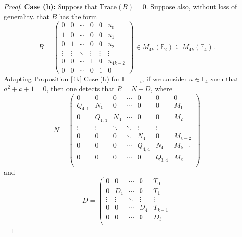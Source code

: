 \documentclass{amsart}
\def\FF{\mathbb{F}}
\theoremstyle{definition}
\theoremstyle{remark}
\numberwithin{equation}{section}
\begin{document}
\begin{proof}
{\bf Case (b):} Suppose that $\text{Trace}(B)=0$. Suppose also, without loss of generality, that $B$ has the form
$$
B=\left(\begin{array}{cccccc}
                                                                          0 & 0 & \cdots & 0 & 0 &u_0\\
                                                                          1 & 0 & \cdots & 0 & 0 &u_1\\
                                                                          0 & 1 & \cdots & 0 & 0 &u_2\\
                                                                          \vdots & \vdots & \ddots & \vdots & \vdots &\vdots\\
                                                                          0 & 0 & \cdots & 1 & 0 &u_{4k-2}\\
                                                                          0 & 0 & \cdots & 0 & 1 &0
                                                                        \end{array}\right)\in M_{4k}(\FF_2)\subseteq M_{4k}(\FF_4).$$
Adapting Proposition \ref{4k} Case (b) for $\FF=\FF_4$, if we consider $a\in \FF_4$ such that $a^2+a+1=0$, then one detects that $B=N+D$, where
$$N=\left(
      \begin{array}{cccccccc}
        0 & 0 & 0 & \cdots & 0 &0 &  0 \\
        Q_{4,1} & N_4 & 0 & \cdots &0 & 0  & M_1 \\
        0 & Q_{4,4} & N_4 & \cdots &0 & 0  & M_2 \\
        \vdots & \vdots & \ddots & \ddots  & \vdots & \vdots \\
        0 & 0 & 0 & \ddots &N_4 & 0 &  M_{k-2} \\
        0 & 0 & 0 & \cdots &Q_{4,4} & N_4 &  M_{k-1} \\
        0 & 0 & 0 & \cdots &0 & Q_{3,4} &  M_k \\
      \end{array}
    \right)
$$
\noindent and
$$
D=\left(
         \begin{array}{ccccc}
           0 & 0 & \cdots  & 0 & T_0 \\
           0 & D_4 & \cdots  & 0 & T_1 \\
           \vdots & \vdots & \ddots  & \vdots & \vdots \\
           0 & 0 & \cdots  & D_4 & T_{k-1} \\
           0 & 0 & \cdots  & 0 & D_3 \\

\end{array}$$
\end{proof}
\end{document}
